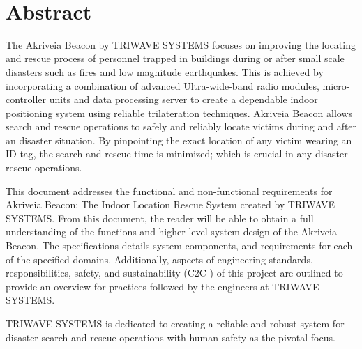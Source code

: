
\
\section*{Abstract}	%
\medskip
The Akriveia Beacon by TRIWAVE SYSTEMS focuses on improving the locating and rescue process of personnel trapped in buildings during or after small scale disasters such as fires and low magnitude earthquakes. This is achieved by incorporating a combination of advanced Ultra-wide-band radio modules, micro-controller units and data processing server to create a dependable indoor positioning system using reliable trilateration techniques. Akriveia Beacon allows search and rescue operations to safely and reliably locate victims during and after an disaster situation. By pinpointing the exact location of any victim wearing an ID tag, the search and rescue time is minimized; which is crucial in any disaster rescue operations.

\bigskip
This document addresses the functional and non-functional requirements for Akriveia Beacon: The Indoor Location Rescue System created by TRIWAVE SYSTEMS. From this document, the reader will be able to obtain a full understanding of the functions and higher-level system design of the Akriveia Beacon. The specifications details system components, and requirements for each of the specified domains. Additionally, aspects of engineering standards, responsibilities, safety, and sustainability (C2C \cite{R25}) of this project are outlined to provide an overview for practices followed by the engineers at TRIWAVE SYSTEMS.

\bigskip
TRIWAVE SYSTEMS is dedicated to creating a reliable and robust system for disaster search and rescue operations with human safety as the pivotal focus.

%